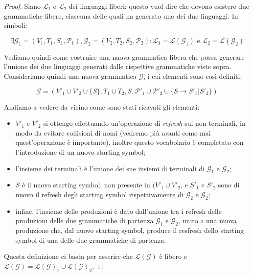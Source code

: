 \documentclass[class=book, crop=false, oneside, 12pt]{standalone}
\begin{document}
\begin{proof}
    Siano \(\mathcal{L}_1\) e \(\mathcal{L}_2\) dei linguaggi liberi; questo vuol dire che devono esistere due grammatiche libere, ciascuna delle quali ha generato uno dei due linguaggi. In simboli:

  \begin{equation*}
    \exists \mathcal{G}_1 = (V_1, T_1, S_1, \mathcal{P}_1), \mathcal{G}_2 = (V_2, T_2, S_2, \mathcal{P}_2) : \mathcal{L}_1 = \mathcal{L}(\mathcal{G}_1) \textrm{ e } \mathcal{L}_2 = \mathcal{L}(\mathcal{G}_2)
  \end{equation*}

  Vediamo quindi come costruire una nuova grammatica libera che possa generare l'unione dei due linguaggi generati dalle rispettive grammatiche viste sopra. Consideriamo quindi una nuova grammatica \(\mathcal{G}\), i cui elementi sono così definiti:

  \begin{equation*}
      \mathcal{G} = (V'_1 \cup V'_2 \cup \{S\}, T_1 \cup T_2, S, \mathcal{P}'_1 \cup \mathcal{P}'_2 \cup \{S \rightarrow S'_1 | S'_2\})
  \end{equation*}

  \noindent Andiamo a vedere da vicino come sono stati ricavati gli elementi:

  \begin{itemize}
    \item \(V'_1\) e \(V'_2\) si ottengo effettuando un'operazione di \emph{refresh} sui non terminali, in modo da evitare collisioni di nomi (vedremo più avanti come mai quest'operazione è importante), inoltre questo vocabolario è completato con l'introduzione di un nuovo starting symbol;
    \item l'insieme dei terminali è l'unione dei sue insiemi di terminali di \(\mathcal{G}_1\) e \(\mathcal{G}_2\);
    \item \(S\) è il nuovo starting symbol, non presente in \((V'_1 \cup V'_2\), e \(S'_1\) e \(S'_2\) sono di nuovo il refresh degli starting symbol rispettivamente di \(\mathcal{G}_2\) e \(\mathcal{G}_2\);
    \item infine, l'insieme delle produzioni è dato dall'unione tra i refresh delle produzioni delle due grammatiche di partenza  \(\mathcal{G}_1\) e \(\mathcal{G}_2\), unito a una nuova produzione che, dal nuovo starting symbol, produce il resfresh dello starting symbol di una delle due grammatiche di partenza.
  \end{itemize}

  \noindent Questa definizione ci basta per asserire che \(\mathcal{L(G)}\) è libero e \(\mathcal{L(G)} = \mathcal{L(G)_1} \cup \mathcal{L(G)_2}\).

\end{proof}
\end{document}
